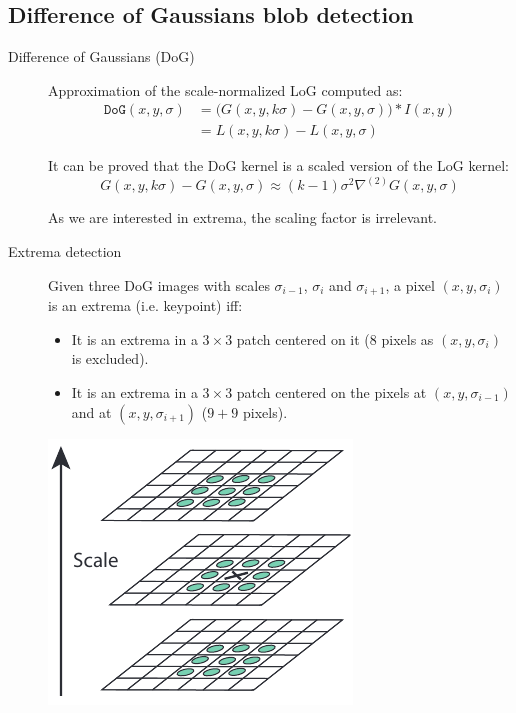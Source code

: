 \subsection{Difference of Gaussians blob detection}

\begin{description}
    \item[Difference of Gaussians (DoG)] 
        Approximation of the scale-normalized LoG computed as:
        \[ 
            \begin{split}
                \texttt{DoG}(x, y, \sigma) &= \big( G(x, y, k\sigma) - G(x, y, \sigma) \big) * I(x, y) \\
                    &= L(x, y, k\sigma) - L(x, y, \sigma) 
            \end{split}
        \]

        \begin{theorem}
            It can be proved that the DoG kernel is a scaled version of the LoG kernel:
            \[ G(x, y, k\sigma) - G(x, y, \sigma) \approx (k-1)\sigma^2 \nabla^{(2)}G(x, y, \sigma) \]

            \begin{remark}
                As we are interested in extrema, the scaling factor is irrelevant.
            \end{remark}
        \end{theorem}

    \item[Extrema detection] 
        Given three DoG images with scales $\sigma_{i-1}$, $\sigma_i$ and $\sigma_{i+1}$,
        a pixel $(x, y, \sigma_i)$ is an extrema (i.e. keypoint) iff:
        \begin{itemize}
            \item It is an extrema in a $3 \times 3$ patch centered on it (8 pixels as $(x, y, \sigma_i)$ is excluded).
            \item It is an extrema in a $3 \times 3$ patch centered on the pixels at $(x, y, \sigma_{i-1})$ and at $(x, y, \sigma_{i+1})$ ($9+9$ pixels).
        \end{itemize}

        \begin{center}
            \includegraphics[width=0.35\linewidth]{./img/_DoG_extrema.pdf}
        \end{center}


\end{description}
